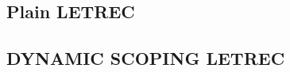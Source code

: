 \documentclass[../codeprint.tex]{subfiles}
\begin{document}
\subsection{Plain LETREC}



\subsection{DYNAMIC SCOPING LETREC}



\end{document}
